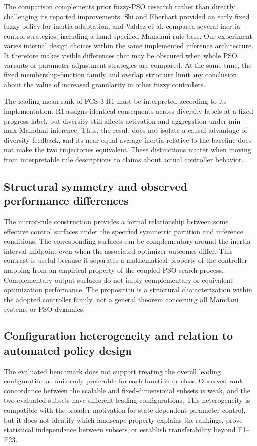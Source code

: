 The comparison complements prior fuzzy-PSO research rather than directly challenging its reported improvements. Shi and Eberhart \cite{ShiEberhart2001} provided an early fixed fuzzy policy for inertia adaptation, and Valdez et al. \cite{Valdez2017} compared several inertia-control strategies, including a hand-specified Mamdani rule base. Our experiment varies internal design choices within the same implemented inference architecture. It therefore makes visible differences that may be obscured when whole PSO variants or parameter-adjustment strategies are compared. At the same time, the fixed membership-function family and overlap structure limit any conclusion about the value of increased granularity in other fuzzy controllers.

The leading mean rank of FCS-3-R1 must be interpreted according to its implementation. R1 assigns identical consequents across diversity labels at a fixed progress label, but diversity still affects activation and aggregation under min--max Mamdani inference. Thus, the result does not isolate a causal advantage of diversity feedback, and its near-equal average inertia relative to the baseline does not make the two trajectories equivalent. These distinctions matter when moving from interpretable rule descriptions to claims about actual controller behavior.

\subsection{Structural symmetry and observed performance differences}
The mirror-rule construction provides a formal relationship between some effective control surfaces under the specified symmetric partition and inference conditions. The corresponding surfaces can be complementary around the inertia interval midpoint even when the associated optimizer outcomes differ. This contrast is useful because it separates a mathematical property of the controller mapping from an empirical property of the coupled PSO search process. Complementary output surfaces do not imply complementary or equivalent optimization performance. The proposition is a structural characterization within the adopted controller family, not a general theorem concerning all Mamdani systems or PSO dynamics.

\subsection{Configuration heterogeneity and relation to automated policy design}
The evaluated benchmark does not support treating the overall leading configuration as uniformly preferable for each function or class. Observed rank concordance between the scalable and fixed-dimensional subsets is weak, and the two evaluated subsets have different leading configurations. This heterogeneity is compatible with the broader motivation for state-dependent parameter control, but it does not identify which landscape property explains the rankings, prove statistical independence between subsets, or establish transferability beyond F1--F23.

